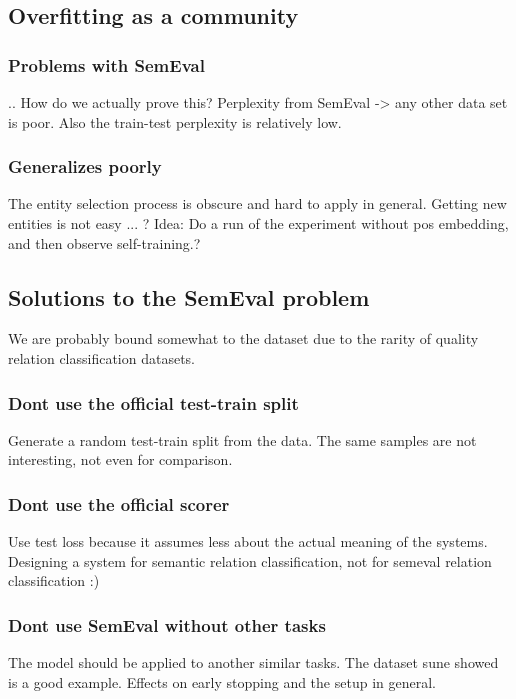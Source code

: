 \subsection{Overfitting as a community}

\subsubsection{Problems with SemEval}

.. How do we actually prove this? Perplexity from SemEval -> any other data set is poor. Also the train-test perplexity is relatively low.

\subsubsection{Generalizes poorly}

The entity selection process is obscure and hard to apply in general. Getting new entities is not easy ... ?
Idea: Do a run of the experiment without pos embedding, and then observe self-training.?

\subsection{Solutions to the SemEval problem}

We are probably bound somewhat to the dataset due to the rarity of quality relation classification datasets.

\subsubsection{Dont use the official test-train split}
Generate a random test-train split from the data. The same samples are not interesting, not even for comparison.

\subsubsection{Dont use the official scorer}
Use test loss because it assumes less about the actual meaning of the systems. 
Designing a system for semantic relation classification, not for semeval relation classification :)

\subsubsection{Dont use SemEval without other tasks}

The model should be applied to another similar tasks. The dataset sune showed is a good example.
Effects on early stopping and the setup in general. 



